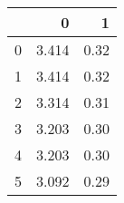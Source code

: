 \begin{tabular}{lrr}
\toprule
{} &      0 &     1 \\
\midrule
0 &  3.414 &  0.32 \\
1 &  3.414 &  0.32 \\
2 &  3.314 &  0.31 \\
3 &  3.203 &  0.30 \\
4 &  3.203 &  0.30 \\
5 &  3.092 &  0.29 \\
\bottomrule
\end{tabular}

